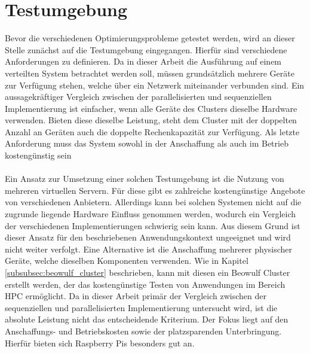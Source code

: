 \section{Testumgebung}
\label{sec:analysis_testsetup}
Bevor die verschiedenen Optimierungsprobleme getestet werden, wird an dieser Stelle zunächst auf die Testumgebung eingegangen. Hierfür sind verschiedene Anforderungen zu definieren. Da in dieser Arbeit die Ausführung auf einem verteilten System betrachtet werden soll, müssen grundsätzlich mehrere Geräte zur Verfügung stehen, welche über ein Netzwerk miteinander verbunden sind. Ein aussagekräftiger Vergleich zwischen der parallelisierten und sequenziellen Implementierung ist einfacher, wenn alle Geräte des Clusters dieselbe Hardware verwenden. Bieten diese dieselbe Leistung, steht dem Cluster mit der doppelten Anzahl an Geräten auch die doppelte Rechenkapazität zur Verfügung. Als letzte Anforderung muss das System sowohl in der Anschaffung als auch im Betrieb kostengünstig sein
\\\\
Ein Ansatz zur Umsetzung einer solchen Testumgebung ist die Nutzung von mehreren virtuellen Servern. Für diese gibt es zahlreiche kostengünstige Angebote von verschiedenen Anbietern. Allerdings kann bei solchen Systemen nicht auf die zugrunde liegende Hardware Einfluss genommen werden, wodurch ein Vergleich der verschiedenen Implementierungen schwierig sein kann. Aus diesem Grund ist dieser Ansatz für den beschriebenen Anwendungskontext ungeeignet und wird nicht weiter verfolgt. Eine Alternative ist die Anschaffung mehrerer physischer Geräte, welche dieselben Komponenten verwenden. Wie in Kapitel \ref{subsubsec:beowulf_cluster} beschrieben, kann mit diesen ein Beowulf Cluster erstellt werden, der das kostengünstige Testen von Anwendungen im Bereich \ac{HPC} ermöglicht. Da in dieser Arbeit primär der Vergleich zwischen der sequenziellen und parallelisierten Implementierung untersucht wird, ist die absolute Leistung nicht das entscheidende Kriterium. Der Fokus liegt auf den Anschaffungs- und Betriebskosten sowie der platzsparenden Unterbringung. Hierfür bieten sich Raspberry Pis besonders gut an.  
\\\\
